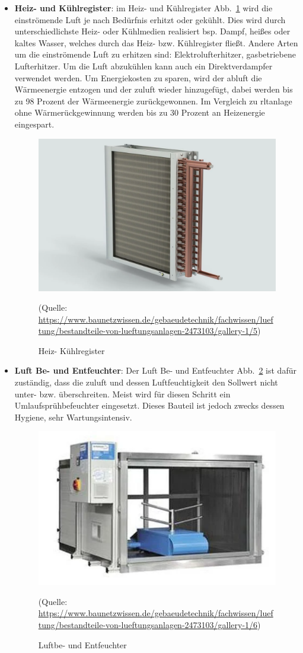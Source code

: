 \begin{itemize}
	\item \textbf{Heiz- und Kühlregister}: im Heiz- und Kühlregister Abb.~\ref{fig:heizregister} wird die einströmende Luft je nach Bedürfnis erhitzt oder gekühlt. Dies wird durch unterschiedlichste Heiz- oder Kühlmedien realisiert bsp. Dampf, heißes oder kaltes Wasser, welches durch das Heiz- bzw. Kühlregister fließt. Andere Arten um die einströmende Luft zu erhitzen sind: Elektrolufterhitzer, gasbetriebene Lufterhitzer. Um die Luft abzukühlen kann auch ein Direktverdampfer verwendet werden.
	Um Energiekosten zu sparen, wird der \gls{abluft} die Wärmeenergie entzogen und der \gls{zuluft} wieder hinzugefügt, dabei werden bis zu 98 Prozent der Wärmeenergie zurückgewonnen. Im Vergleich zu \ac{rltanlage} ohne Wärmerückgewinnung werden bis zu 30 Prozent an Heizenergie eingespart. 

\begin{figure}[H]
	\centering
	\includegraphics[width=0.5\linewidth]{Bilder/luftwaermeregister}
	\caption{Heiz- Kühlregister} 
	(Quelle: \url{https://www.baunetzwissen.de/gebaeudetechnik/fachwissen/lueftung/bestandteile-von-lueftungsanlagen-2473103/gallery-1/5})
	\label{fig:heizregister}
\end{figure}

	\item \textbf{Luft Be- und Entfeuchter}: Der Luft Be- und Entfeuchter Abb.~\ref{fig:luftbefeuchter} ist dafür zuständig, dass die \gls{zuluft} und dessen Luftfeuchtigkeit den Sollwert nicht unter- bzw. überschreiten. Meist wird für diesen Schritt ein Umlaufsprühbefeuchter eingesetzt. Dieses Bauteil ist jedoch zwecks dessen Hygiene, sehr Wartungsintensiv. 

\begin{figure}[H]
	\centering
	\includegraphics[width=0.5\linewidth]{Bilder/Luftbefeuchter}
	\caption{Luftbe- und Entfeuchter} 
	(Quelle: \url{	https://www.baunetzwissen.de/gebaeudetechnik/fachwissen/lueftung/bestandteile-von-lueftungsanlagen-2473103/gallery-1/6})
	\label{fig:luftbefeuchter}
\end{figure}


\end{itemize}
